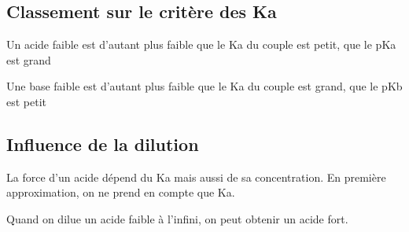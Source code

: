 \documentclass[french]{yLectureNote}
\begin{document}
\subsection{Classement sur le critère des Ka}
Un acide faible est d'autant plus faible que le Ka du couple est petit, que le pKa est grand

Une base faible est d'autant plus faible que le Ka du couple est grand, que le pKb est petit

\subsection{Influence de la dilution}
\begin{proposition}
La force d'un acide dépend du Ka mais aussi de sa concentration. En première approximation, on ne prend en compte que Ka.
\end{proposition}
Quand on dilue un acide faible à l'infini, on peut obtenir un acide fort.
\end{document}
